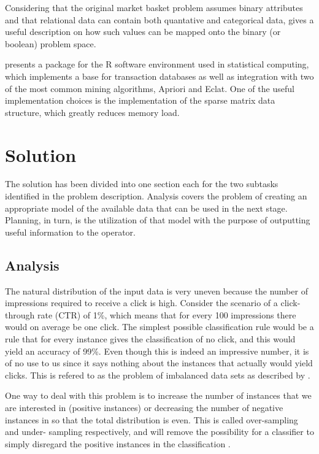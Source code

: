 \documentclass[a4paper]{article}
\begin{document}
Considering that the original market basket problem assumes binary attributes and that relational data can contain both
quantative and categorical data, \citep{Srikant1996} gives a useful description on how such values can be mapped onto the
binary (or boolean) problem space.

\citet{Hahsler2007} presents a package for the R software environment used in statistical computing, which implements a base
for transaction databases as well as integration with two of the most common mining algorithms, Apriori and Eclat. One of the
useful implementation choices is the implementation of the sparse matrix data structure, which greatly reduces memory load.

\section{Solution}
The solution has been divided into one section each for the two subtasks identified in the problem description. Analysis covers
the problem of creating an appropriate model of the available data that can be used in the next stage. Planning, in turn, is the 
utilization of that model with the purpose of outputting useful information to the operator.

\subsection{Analysis}
The natural distribution of the input data is very uneven because the number of impressions required to receive a click is high.
Consider the scenario of a click-through rate (CTR) of 1\%, which means that for every 100 impressions there would on average be one
click. The simplest possible classification rule would be a rule that for every instance gives the classification of no click, and
this would yield an accuracy of 99\%. Even though this is indeed an impressive number, it is of no use to us since it says nothing
about the instances that actually would yield clicks. This is refered to as the problem of imbalanced data sets as described by
\citet{Chawla2004}.

One way to deal with this problem is to increase the number of instances that we are interested in (positive instances) or 
decreasing the number of negative instances in so that the total distribution is even. This is called over-sampling and under-
sampling respectively, and will remove the possibility for a classifier to simply disregard the positive instances in the 
classification \citep{Chawla2004, Japkowicz2002}.
\end{document}
